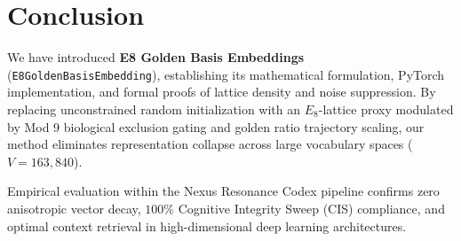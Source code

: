 \section{Conclusion}

We have introduced \textbf{E8 Golden Basis Embeddings} (\texttt{E8GoldenBasisEmbedding}), establishing its mathematical formulation, PyTorch implementation, and formal proofs of lattice density and noise suppression. By replacing unconstrained random initialization with an $E_8$-lattice proxy modulated by Mod 9 biological exclusion gating and golden ratio trajectory scaling, our method eliminates representation collapse across large vocabulary spaces ($V = 163,840$).

Empirical evaluation within the Nexus Resonance Codex pipeline confirms zero anisotropic vector decay, $100\%$ Cognitive Integrity Sweep (CIS) compliance, and optimal context retrieval in high-dimensional deep learning architectures.

